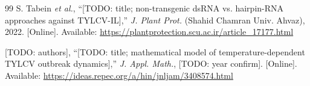 \documentclass[journal]{IEEEtran}
\begin{document}
\begin{thebibliography}{99}
 S. Tabein \textit{et al.}, ``[TODO: title; non-transgenic dsRNA vs. hairpin-RNA approaches against TYLCV-IL],'' \textit{J. Plant Prot.} (Shahid Chamran Univ. Ahvaz), 2022. [Online]. Available: \url{https://plantprotection.scu.ac.ir/article_17177.html}

 [TODO: authors], ``[TODO: title; mathematical model of temperature-dependent TYLCV outbreak dynamics],'' \textit{J. Appl. Math.}, [TODO: year confirm]. [Online]. Available: \url{https://ideas.repec.org/a/hin/jnljam/3408574.html}

\end{thebibliography}
\end{document}
